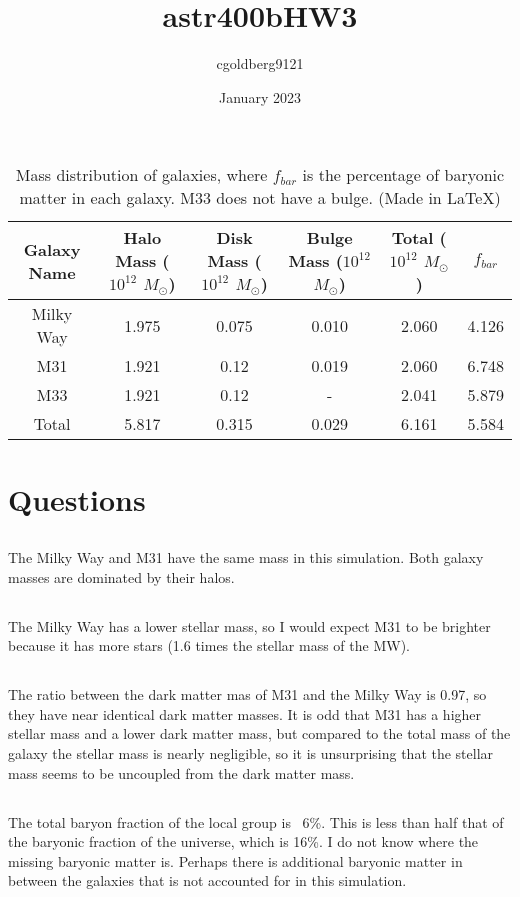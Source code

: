 \documentclass{article}
\title{astr400bHW3}
\author{cgoldberg9121 }
\date{January 2023}
\begin{document}
\begin{table}
    \centering
    \hspace*{-4.12cm}
    \begin{tabular}{|c|c|c|c|c|c|}
        \hline
         \textbf{Galaxy Name} & \textbf{Halo Mass ($10^{12}$ $M_{\odot}$)}& \textbf{Disk Mass ($10^{12}$ $M_{\odot}$)} & \textbf{Bulge Mass ($10^{12}$ $M_{\odot}$)} & \textbf{Total ($10^{12}$ $M_{\odot}$)} & \textbf{$f_{bar}$}  \\ \hline
         Milky Way & 1.975 & 0.075 & 0.010 & 2.060 & 4.126\\
         M31 & 1.921 & 0.12 & 0.019 & 2.060 & 6.748\\
         M33 & 1.921 & 0.12 & -& 2.041 & 5.879\\
         Total &5.817 & 0.315 & 0.029&6.161&5.584\\
         \hline
    \end{tabular}
    \caption{Mass distribution of galaxies, where $f_{bar}$ is the percentage of baryonic matter in each galaxy. M33 does not have a bulge. (Made in LaTeX)}
    \label{tab:my_label}
\end{table}

\section{Questions}

\subsection{}

The Milky Way and M31 have the same mass in this simulation. Both galaxy masses are dominated by their halos.

\subsection{}

The Milky Way has a lower stellar mass, so I would expect M31 to be brighter because it has more stars (1.6 times the stellar mass of the MW).

\subsection{}

The ratio between the dark matter mas of M31 and the Milky Way is 0.97, so they have near identical dark matter masses. It is odd that M31 has a higher stellar mass and a lower dark matter mass, but compared to the total mass of the galaxy the stellar mass is nearly negligible, so it is unsurprising that the stellar mass seems to be uncoupled from the dark matter mass.

\subsection{}

The total baryon fraction of the local group is ~6\%. This is less than half that of the baryonic fraction of the universe, which is 16\%. I do not know where the missing baryonic matter is. Perhaps there is additional baryonic matter in between the galaxies that is not accounted for in this simulation.
\end{document}
